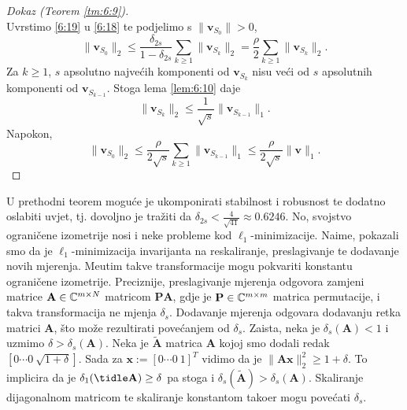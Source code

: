\documentclass[a4paper,twoside,12pt]{memoir} %
\newcommand{\vect}[1]{\mathbf{#1}}
\renewcommand{\vec}{\vect}
\newcommand{\norm}[1]{\|{#1}\|}
\begin{document}
\begin{proof}[Dokaz (Teorem \ref{tm:6:9})]
\begin{equation}
    \end{equation}
    Uvrstimo \eqref{6:19} u \eqref{6:18} te podjelimo s $\norm{\vec v_{S_0}} > 0$, 
    \begin{equation*}
        \norm{\vec v_{S_0}}_2 \leq \frac{\delta_{2s}}{1 - \delta_{2s}} \sum_{k \geq 1} \norm{\vec v_{S_k}}_2 = \frac{\rho}{2} \sum_{k \geq 1} \norm{\vec v_{S_k}}_2.
    \end{equation*}
    Za $k \geq 1$, $s$ apsolutno najve\'cih komponenti od $\vec v_{S_k}$ nisu ve\'ci od $s$ apsolutnih komponenti od $\vec v_{S_{k-1}}$. Stoga lema \ref{lem:6:10} daje
    \begin{equation*}
        \norm{\vec v_{S_k}}_2 \leq \frac{1}{\sqrt{s}} \norm{\vec v_{S_{k-1}}}_1.
    \end{equation*}
    Napokon, 
    \begin{equation*}
        \norm{\vec v_{S_0}}_2 \leq \frac{\rho}{2 \sqrt{s}} \sum_{k \geq 1} \norm{\vec v_{S_{k-1}}}_1 \leq \frac{\rho}{2 \sqrt{s}} \norm{\vec v}_1. 
    \end{equation*}
\end{proof}

U prethodni teorem mogu\'ce je ukomponirati stabilnost i robusnost te dodatno oslabiti uvjet, tj. dovoljno  je tra\v{z}iti da $\delta_{2s} < \frac{4}{\sqrt{41}} \approx 0.6246$. No, svojstvo ograni\v{c}ene izometrije nosi i neke probleme kod $\ell_1$-minimizacije. Naime, pokazali smo da je $\ell_1$-minimizacija invarijanta na reskaliranje, preslagivanje te dodavanje novih mjerenja. Me\dj utim takve transformacije mogu pokvariti konstantu ograni\v{c}ene izometrije. Preciznije, preslagivanje mjerenja odgovora zamjeni matrice $\vec A \in \C^{m \times N}$ matricom $\vec{PA}$, gdje je $\vec P \in \C^{m \times m}$ matrica permutacije, i takva transformacija ne mjenja $\delta_s$. Dodavanje mjerenja odgovara dodavanju retka matrici $\vec A$, \v{s}to mo\v{z}e rezultirati pove\'canjem od $\delta_s$. Zaista, neka je $\delta_s(\vec A) < 1$ i uzmimo $\delta > \delta_s(\vec A)$. Neka je $\vec{\tilde A}$ matrica $\vec A$ kojoj smo dodali redak $[0 \cdots 0\ \sqrt{1+\delta}]$. Sada za $\vec x := [0 \cdots 0\ 1]^T$ vidimo da je $\norm{\vec{Ax}}^2_2 \geq 1+\delta$. To implicira da je $\delta_1(\vec{\tidle A}) \geq \delta$ pa stoga i $\delta_s(\vec{\tilde A}) > \delta_s(\vec A)$. Skaliranje dijagonalnom matricom te skaliranje konstantom tako\dj er mogu pove\'cati $\delta_s$.
\end{document}
